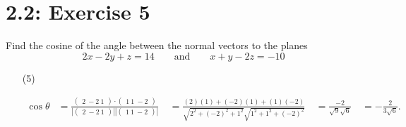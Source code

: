 \documentclass{report}
\begin{document}
\section*{2.2: Exercise 5} 

Find the cosine of the angle between the normal vectors to the planes 
\[
2x - 2y + z = 14 \qquad \text{and}\qquad x + y - 2z = -10
\]


\sol 

\begin{enumerate}
\item[(5)]     

\begin{align*}
\cos \theta &= \frac{\begin{pmatrix} 2 \ -2 \ 1 \end{pmatrix} \cdot \begin{pmatrix} 1 \ 1 \ -2 \end{pmatrix}}{\left| \begin{pmatrix} 2 \ -2 \ 1 \end{pmatrix} \right| \left| \begin{pmatrix} 1 \ 1 \ -2 \end{pmatrix} \right|} \
&= \frac{(2)(1) + (-2)(1) + (1)(-2)}{\sqrt{2^2 + (-2)^2 + 1^2} \sqrt{1^2 + 1^2 + (-2)^2}} \
&= \frac{-2}{\sqrt{9} \sqrt{6}} \
&= \boxed{-\frac{2}{3\sqrt{6}}}.
\end{align*}



\end{enumerate}
\end{document}
